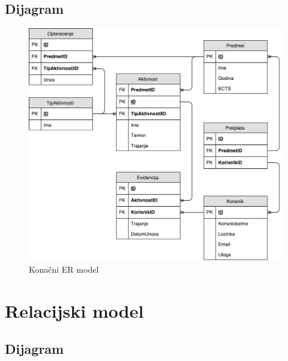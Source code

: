 \documentclass[times, utf8, zavrsni, numeric]{fer}
\begin{document}
\subsection{Dijagram}

\begin{figure}[H]
\centering
\includegraphics[scale=0.6]{img/relacijski-model.pdf}
\caption{Konačni ER model}
\label{fig:er-model}
\end{figure}

\section{Relacijski model}
\subsection{Dijagram}
\end{document}
